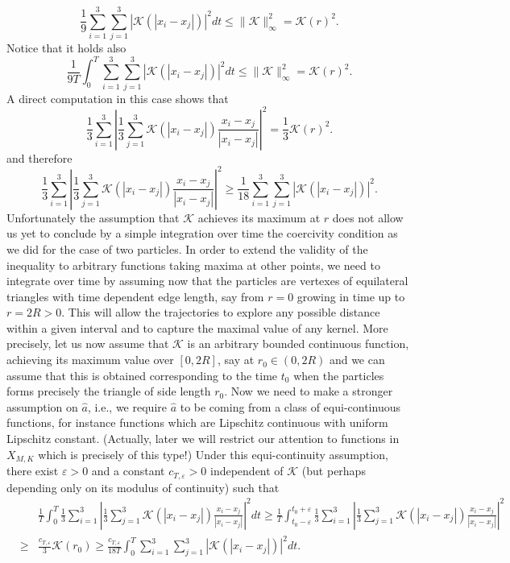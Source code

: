 $$
\frac{1}{9}   \sum_{i=1}^3 \sum_{j=1}^3 |\mathcal K(|x_i-x_j|)|^2  dt \leq \|\mathcal K\|_\infty^2 = \mathcal K(r)^2.
$$
Notice that it holds also
\begin{equation}\label{maxbound}
\frac{1}{9 T} \int_0^T  \sum_{i=1}^3 \sum_{j=1}^3 |\mathcal K(|x_i-x_j|)|^2  dt \leq \|\mathcal K\|_\infty^2 = \mathcal K(r)^2.
\end{equation}
A direct computation in this case shows that 
$$
 \frac{1}{3} \sum_{i=1}^3 \left | \frac{1}{3} \sum_{j=1}^3 \mathcal K(|x_i-x_j|) \frac{x_i-x_j}{|x_i-x_j|} \right |^2 =\frac{1}{3}  \mathcal K(r)^2.
$$
and therefore
$$ 
\frac{1}{3} \sum_{i=1}^3 \left | \frac{1}{3} \sum_{j=1}^3 \mathcal K(|x_i-x_j|) \frac{x_i-x_j}{|x_i-x_j|} \right |^2 \geq \frac{1}{18}   \sum_{i=1}^3 \sum_{j=1}^3 |\mathcal K(|x_i-x_j|)|^2.
$$
Unfortunately the assumption that $\mathcal K$ achieves its maximum at $r$ does not  allow us yet to conclude by a simple integration over time the coercivity condition as we did for the case of two particles. In order to extend the validity of the inequality to arbitrary functions taking maxima at other points, we need to integrate over time by assuming now that the particles are vertexes of equilateral triangles with time dependent edge length, say from $r=0$ growing in time up to $r=2 R>0$. This will allow the trajectories to explore any possible distance within a given interval and to capture the maximal value of  any kernel. More precisely, let us now assume that $\mathcal K$ is an arbitrary bounded continuous function,  achieving its maximum value over $[0,2R]$, say at $r_0 \in (0,2R)$ and we can assume that this is obtained corresponding to the time $t_0$ when the particles forms precisely the triangle of side length $r_0$. Now we need to make a stronger assumption on $\widehat a$, i.e., we require $\widehat a$ to be coming from a class of equi-continuous functions, for instance functions which are Lipschitz continuous with uniform Lipschitz constant. (Actually, later we will restrict our attention  to functions in $X_{M,K}$ which is precisely of this type!)
Under this equi-continuity assumption, there exist $\varepsilon>0$ and a constant $c_{T,\varepsilon}>0$ independent of $\mathcal K$ (but perhaps depending only on its modulus of continuity) such that
\begin{eqnarray*}\label{coercint}
&&\frac{1}{T} \int_0^T \frac{1}{3} \sum_{i=1}^3 \left | \frac{1}{3} \sum_{j=1}^3 \mathcal K(|x_i-x_j|) \frac{x_i-x_j}{|x_i-x_j|} \right |^2 dt \geq \frac{1}{T} \int_{t_0 - \varepsilon}^{t_0+\varepsilon} \frac{1}{3} \sum_{i=1}^3 \left | \frac{1}{3} \sum_{j=1}^3 \mathcal K(|x_i-x_j|) \frac{x_i-x_j}{|x_i-x_j|} \right |^2 \\
&\geq & \frac{c_{T,\varepsilon}}{3}  \mathcal K(r_0) \geq \frac{c_{T,\varepsilon}}{18T } \int_0^T  \sum_{i=1}^3 \sum_{j=1}^3 |\mathcal K(|x_i-x_j|)|^2  dt.
\end{eqnarray*}
